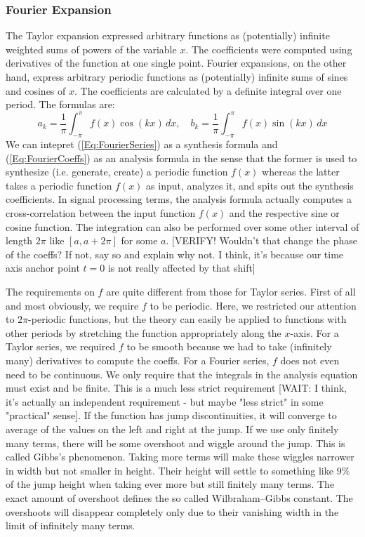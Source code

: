 

\subsubsection{Fourier Expansion}
The Taylor expansion expressed arbitrary functions as (potentially) infinite weighted sums of powers of the variable $x$. The coefficients were computed using derivatives of the function at one single point. Fourier expansions, on the other hand, express arbitrary periodic functions as (potentially) infinite sums of sines and cosines of $x$. The coefficients are calculated by a definite integral over one period. The formulas are:
\begin{equation}
\label{Eq:FourierCoeffs}	
 a_k = \frac{1}{\pi} \int_{-\pi}^{\pi} f(x) \cos(k x) \, dx, \quad
 b_k = \frac{1}{\pi} \int_{-\pi}^{\pi} f(x) \sin(k x) \, dx 
\end{equation}
We can intepret (\ref{Eq:FourierSeries}) as a synthesis formula and (\ref{Eq:FourierCoeffs}) as an analysis formula in the sense that the former is used to synthesize (i.e. generate, create) a periodic function $f(x)$ whereas the latter takes a periodic function $f(x)$ as input, analyzes it, and spits out the synthesis coefficients. In signal processing terms,  the analysis formula actually computes a cross-correlation between the input function $f(x)$ and the respective sine or cosine function. The integration can also be performed over some other interval of length $2\pi$ like $[a,a+2\pi]$ for some $a$. [VERIFY! Wouldn't that change the phase of the coeffs? If not, say so and explain why not. I think, it's because our time axis anchor point $t=0$ is not really affected by that shift] 

\medskip
The requirements on $f$ are quite different from those for Taylor series. First of all and most obviously, we require $f$ to be periodic. Here, we restricted our attention to $2 \pi$-periodic functions, but the theory can easily be applied to functions with other periods by stretching the function appropriately along the $x$-axis.  For a Taylor series, we required $f$ to be smooth because we had to take (infinitely many) derivatives to compute the coeffs. For a Fourier series, $f$ does not even need to be continuous. We only require that the integrals in the analysis equation must exist and be finite. This is a much less strict requirement [WAIT: I think, it's actually an independent requirement - but maybe "less strict" in some "practical" sense]. If the function has jump discontinuities, it will converge to average of the values on the left and right at the jump. If we use only finitely many terms, there will be some overshoot and wiggle around the jump. This is called Gibbs's phenomenon. Taking more terms will make these wiggles narrower in width but not smaller in height. Their height will settle to something like $9\%$ of the jump height when taking ever more but still finitely many terms. The exact amount of overshoot defines the so called Wilbraham–Gibbs constant. The overshoots will disappear completely only due to their vanishing width in the limit of infinitely many terms.

